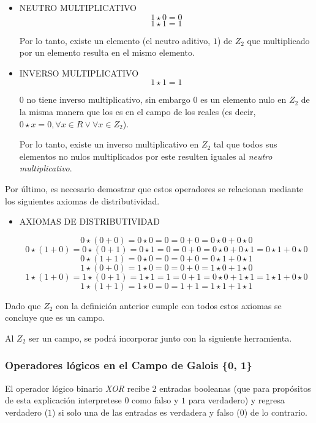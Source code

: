 \documentclass{article}
\begin{document}
\begin{itemize}
    \item NEUTRO MULTIPLICATIVO
$$
1 \star 0 = 0
$$$$
1 \star 1 = 1
$$

Por lo tanto, existe un elemento (el neutro aditivo, $1$) de $Z_2$ que multiplicado por un elemento resulta en el mismo elemento.

    \item INVERSO MULTIPLICATIVO
$$
1 \star 1 = 1
$$

$0$ no tiene inverso multiplicativo, sin embargo $0$ es un elemento nulo en $Z_2$ de la misma manera que los es en el campo de los reales (es decir, $0 \star x = 0, \forall x \in R \lor \forall x \in Z_2$).

Por lo tanto, existe un inverso multiplicativo en $Z_2$ tal que todos sus elementos no nulos multiplicados por este resulten iguales al \textit{neutro multiplicativo}.
\end{itemize}

Por último, es necesario demostrar que estos operadores se relacionan mediante los siguientes axiomas de distributividad.

\begin{itemize}
    \item AXIOMAS DE DISTRIBUTIVIDAD

$$
0 \star ( 0 + 0 ) = 0 \star 0 = 0 = 0 + 0 = 0 \star 0 + 0 \star 0
$$$$
0 \star (1 + 0) = 0 \star ( 0 + 1 ) = 0 \star 1 = 0 = 0 + 0 = 0 \star 0 + 0 \star 1 = 0 \star 1 + 0 \star 0
$$$$
0 \star ( 1 + 1 ) = 0 \star 0 = 0 = 0 + 0 = 0 \star 1 + 0 \star 1
$$$$
1 \star ( 0 + 0 ) = 1 \star 0 = 0 = 0 + 0 = 1 \star 0 + 1 \star 0
$$$$
1 \star (1 + 0) = 1 \star ( 0 + 1 ) = 1 \star 1 = 1 = 0 + 1 = 0 \star 0 + 1 \star 1 = 1 \star 1 + 0 \star 0
$$$$
1 \star ( 1 + 1 ) = 1 \star 0 = 0 = 1 + 1 = 1 \star 1 + 1 \star 1
$$

\end{itemize}

Dado que $Z_2$ con la definición anterior cumple con todos estos axiomas se concluye que es un campo.

Al $Z_2$ ser un campo, se podrá incorporar junto con la siguiente herramienta.

\subsubsection{Operadores lógicos en el Campo de Galois \{0, 1\}}

El operador lógico binario \textit{XOR} recibe 2 entradas booleanas (que para propósitos de esta explicación interpretese $0$ como falso y $1$ para verdadero) y regresa verdadero ($1$) si solo una de las entradas es verdadera y falso ($0$) de lo contrario.
\end{document}
